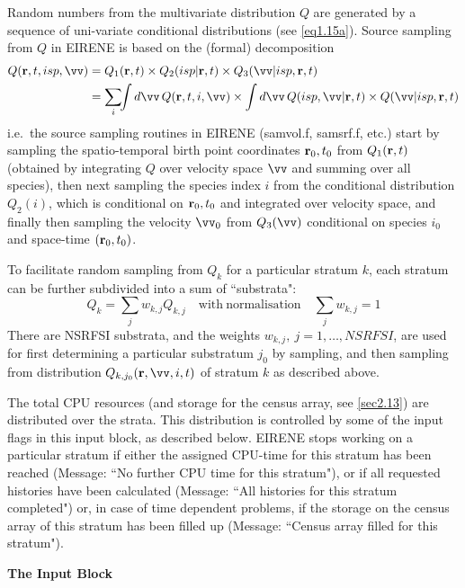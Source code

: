 Random numbers from the multivariate distribution $Q$ are generated by a
sequence of uni-variate conditional distributions (see \cref{eq1.15a}).
Source sampling from $Q$ in EIRENE is based on the (formal) decomposition
\begin{align}
  \label{samp-Q} Q(\vr,t,isp,\vv) & = Q_1(\vr,t) \times
  Q_2(isp|\vr,t) \times Q_3(\vv|isp,\vr,t) \nonumber                       \\
                                  & = \sum_i\!\!\int d\vv \,Q(\vr,t,i,\vv)
  \times \int d\vv \,Q(isp,\vv|\vr,t)
  \times Q(\vv |isp,\vr,t)
\end{align}
i.e.\ the source sampling routines in EIRENE
(samvol.f, samsrf.f, etc.)
start by sampling the spatio-temporal birth point
coordinates $\mathbf{r}_0,t_0$
from $Q_1(\mathbf{r},t)$ (obtained by integrating $Q$ over velocity space $\vv$ and
summing over all species), then next sampling the species index $i$
from the conditional distribution $Q_2(i) $, which is conditional on
$\mathbf{r}_0,t_0$ and integrated over velocity space,
and finally then sampling the velocity $\vv_0$ from $Q_3(\vv)$ conditional on
species $i_0$ and space-time $(\mathbf{r}_0,t_0)$.

To facilitate random sampling from $Q_k$ for a particular stratum $k$, each
stratum can be further subdivided into a sum of ``substrata":
\begin{equation}
  Q_k= \sum_j w_{k,j} Q_{k,j}  \quad \mathrm{with\ normalisation} \quad \sum_j
  w_{k,j} = 1
\end{equation}
There are NSRFSI substrata, and the weights
$w_{k,j}, \ j = 1, \dots, NSRFSI$, are used for first determining a particular
substratum $j_0$ by sampling, and then sampling from distribution
$Q_{k,j_0}(\vr,\vv,i,t)$ of stratum $k$ as described above.

The total CPU resources (and storage for the census array, see \cref{sec2.13})
are distributed over the strata.
This distribution is controlled by some of the input flags in this input block,
as described below.
EIRENE stops working on a particular stratum if either the assigned CPU-time
for this stratum has been reached (Message: ``No further CPU time for this
stratum"), or if all requested histories have been calculated (Message: ``All
histories for this stratum completed") or, in case of time dependent problems,
if the storage on the census array of this stratum has been filled up (Message:
``Census array filled for this stratum").

\medskip

\textbf{The Input Block} 


